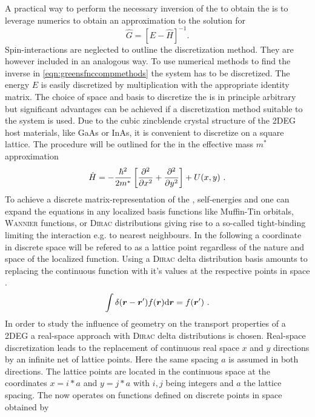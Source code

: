 A practical way to perform the necessary inversion of the \hamil{} to obtain the \gfnc{} is to leverage numerics to obtain an approximation to the solution for
\begin{equation}
	\hat{G} = \left[E-\hat{H} \right]^{-1}\text{.}
  \label{eqn:greensfnccompmethods}
\end{equation}
Spin-interactions are neglected to outline the discretization method. They are however included in an analogous way. To use numerical methods to find the inverse in \cref{eqn:greensfnccompmethods} the system has to be discretized. The energy $E$ is easily discretized by multiplication with the appropriate identity matrix. The choice of space and basis to discretize the \hamil{} is in principle arbitrary but significant advantages can be achieved if a discretization method suitable to the system is used. Due to the cubic zincblende crystal structure of the 2DEG host materials, like GaAs or InAs, it is convenient to discretize on a square lattice.
The procedure will be outlined for the \hamil{} in the effective mass $m^*$ approximation
\begin{equation}
  \hat{H}=-\frac{\hbar^{2}}{2m^*}\left[\pdd{}{x}+\pdd{}{y}\right]+U(x,y)\ .
    \label{eqn:Hamil}
\end{equation}
To achieve a discrete matrix-representation of the \hamil{}, self-energies and \gfnc{} one can expand the equations in any localized basis functions like Muffin-Tin orbitals, \textsc{Wannier} functions, or \textsc{Dirac} distributions giving rise to a so-called tight-binding \hamil{} limiting the interaction e.g. to nearest neighbours. In the following a coordinate in discrete space will be refered to as a lattice point regardless of the nature and space of the localized function.
Using a \textsc{Dirac} delta distribution basis amounts to replacing the continuous function with it's values at the respective points in space \cite{JApplPhys.92.3730}.
\begin{equation}
  \int \delta (\boldsymbol{r}-\boldsymbol{r}') f(\boldsymbol{r}) \mathrm{d}\boldsymbol{r} = f(\boldsymbol{r}')\ .
  \label{eqn:deltabasis}
\end{equation}
In order to study the influence of geometry on the transport properties of a 2DEG a real-space approach with \textsc{Dirac} delta distributions is chosen. Real-space discretization leads to the replacement of continuous real space $x$ and $y$ directions by an infinite net of lattice points. Here the same spacing $a$ is assumed in both directions. The lattice points are located in the continuous space at the coordinates $x=i*a$ and $y=j*a$ with $i,j$ being integers and $a$ the lattice spacing. The \hamil{} now operates on functions defined on discrete points in space obtained by
